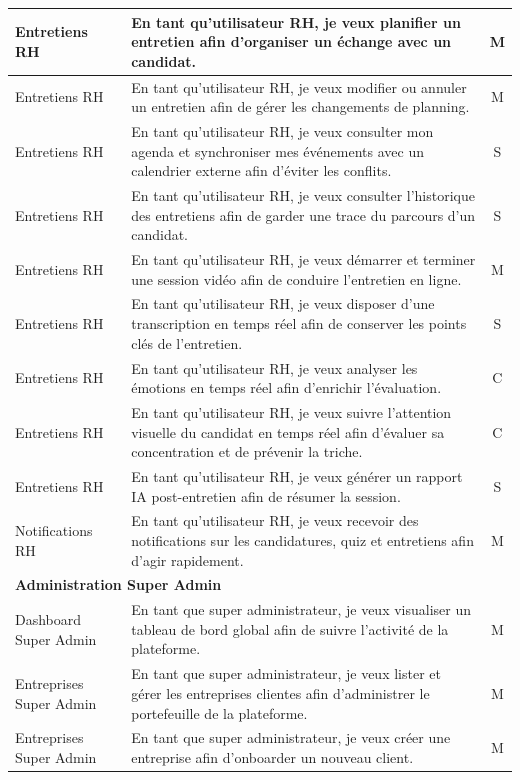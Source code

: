 \begin{longtable}{|p{3.5cm}|p{10cm}|c|}
Entretiens RH & En tant qu'utilisateur RH, je veux planifier un entretien afin d'organiser un échange avec un candidat. & M \\ \hline
Entretiens RH & En tant qu'utilisateur RH, je veux modifier ou annuler un entretien afin de gérer les changements de planning. & M \\ \hline
Entretiens RH & En tant qu'utilisateur RH, je veux consulter mon agenda et synchroniser mes événements avec un calendrier externe afin d'éviter les conflits. & S \\ \hline
Entretiens RH & En tant qu'utilisateur RH, je veux consulter l'historique des entretiens afin de garder une trace du parcours d'un candidat. & S \\ \hline
Entretiens RH & En tant qu'utilisateur RH, je veux démarrer et terminer une session vidéo afin de conduire l'entretien en ligne. & M \\ \hline
Entretiens RH & En tant qu'utilisateur RH, je veux disposer d'une transcription en temps réel afin de conserver les points clés de l'entretien. & S \\ \hline
Entretiens RH & En tant qu'utilisateur RH, je veux analyser les émotions en temps réel afin d'enrichir l'évaluation. & C \\ \hline
Entretiens RH & En tant qu'utilisateur RH, je veux suivre l'attention visuelle du candidat en temps réel afin d'évaluer sa concentration et de prévenir la triche.& C \\ \hline
Entretiens RH & En tant qu'utilisateur RH, je veux générer un rapport IA post-entretien afin de résumer la session. & S \\ \hline
Notifications RH & En tant qu'utilisateur RH, je veux recevoir des notifications sur les candidatures, quiz et entretiens afin d'agir rapidement. & M \\ \hline
\multicolumn{3}{|l|}{\textbf{Administration Super Admin}} \\ \hline
Dashboard Super Admin & En tant que super administrateur, je veux visualiser un tableau de bord global afin de suivre l'activité de la plateforme. & M \\ \hline
Entreprises Super Admin & En tant que super administrateur, je veux lister et gérer les entreprises clientes afin d'administrer le portefeuille de la plateforme. & M \\ \hline
Entreprises Super Admin & En tant que super administrateur, je veux créer une entreprise afin d'onboarder un nouveau client. & M \\ \hline

\end{longtable}
